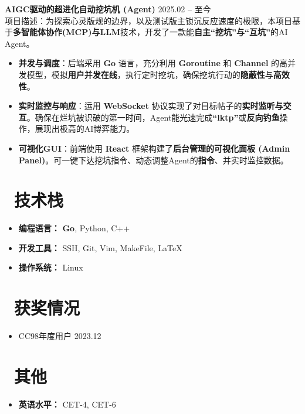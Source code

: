 \documentclass[11pt]{article}
\newlength{\interProjectSpacing}
\newcommand{\projectsep}{\vspace{\interProjectSpacing}}
\newlength{\intraProjectTitleSep}
\newcommand{\titlebreak}{\\[\intraProjectTitleSep]}
\newlength{\intraProjectListTopSep}
\begin{document}
\projectsep

\textbf{AIGC驱动的超进化自动挖坑机 (Agent)} \hfill 2025.02 -- 至今 \titlebreak
项目描述：为探索心灵版规的边界，以及测试版主锁沉反应速度的极限，本项目基于\textbf{多智能体协作(MCP)与LLM}技术，开发了一款能\textbf{自主“挖坑”与“互坑”}的AI Agent。
\begin{itemize}[nosep, topsep=\intraProjectListTopSep] 
  \item \textbf{并发与调度}：后端采用 \textbf{Go} 语言，充分利用 \textbf{Goroutine} 和 \textbf{Channel} 的高并发模型，模拟\textbf{用户并发在线}，执行定时挖坑，确保挖坑行动的\textbf{隐蔽性}与\textbf{高效性}。 
  \item \textbf{实时监控与响应}：运用 \textbf{WebSocket} 协议实现了对目标帖子的\textbf{实时监听与交互}。确保在烂坑被识破的第一时间，Agent能光速完成\textbf{“lktp”}或\textbf{反向钓鱼}操作，展现出极高的AI博弈能力。 
  \item \textbf{可视化GUI}：前端使用 \textbf{React} 框架构建了\textbf{后台管理的可视化面板 (Admin Panel)}。可一键下达挖坑指令、动态调整Agent的\textbf{指令}、并实时监控数据。
\end{itemize}

\section{\makebox[\widthof{\faCogs}][c]{\color{CVBlue}\faCogs}\ 技术栈}
\begin{itemize}[nosep] 
  \item \textbf{编程语言：} \textbf{Go}, Python, C++ 
  \item \textbf{开发工具：} SSH, Git, Vim, MakeFile, LaTeX 
  \item \textbf{操作系统：} Linux
\end{itemize}

\section{\makebox[\widthof{\faGraduationCap}][c]{\color{CVBlue}\faList}\ 获奖情况}
\begin{itemize} 
  \item CC98年度用户 \hfill 2023.12 
\end{itemize} 

\section{\makebox[\widthof{\faInfo}][c]{\color{CVBlue}\faInfo}\ 其他}
\begin{itemize}[parsep=0.5ex] 
  \item \textbf{英语水平：} CET-4, CET-6
\end{itemize}
\end{document}
